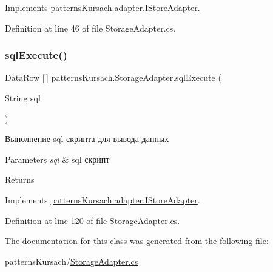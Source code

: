 Implements \mbox{\hyperlink{interfacepatterns_kursach_1_1adapter_1_1_i_store_adapter_aa213143da13c4772d0aa695ece08b3ac}{patterns\+Kursach.\+adapter.\+I\+Store\+Adapter}}.



Definition at line 46 of file Storage\+Adapter.\+cs.

\mbox{\label{classpatterns_kursach_1_1_storage_adapter_a6ad39a4e1cc12887ba0f3f8563032c6d}} 
\subsubsection{\texorpdfstring{sql\+Execute()}{sqlExecute()}}
{\footnotesize\ttfamily Data\+Row \mbox{[}$\,$\mbox{]} patterns\+Kursach.\+Storage\+Adapter.\+sql\+Execute (\begin{DoxyParamCaption}\item[{String}]{sql }\end{DoxyParamCaption})}



Выполнение sql скрипта для вывода данных 


\begin{DoxyParams}{Parameters}
{\em sql} & sql скрипт\\
\hline
\end{DoxyParams}
\begin{DoxyReturn}{Returns}

\end{DoxyReturn}


Implements \mbox{\hyperlink{interfacepatterns_kursach_1_1adapter_1_1_i_store_adapter_a2f461380a248778258d993f8dc1eb265}{patterns\+Kursach.\+adapter.\+I\+Store\+Adapter}}.



Definition at line 120 of file Storage\+Adapter.\+cs.



The documentation for this class was generated from the following file\+:\begin{DoxyCompactItemize}
\item 
patterns\+Kursach/\mbox{\hyperlink{_storage_adapter_8cs}{Storage\+Adapter.\+cs}}\end{DoxyCompactItemize}
